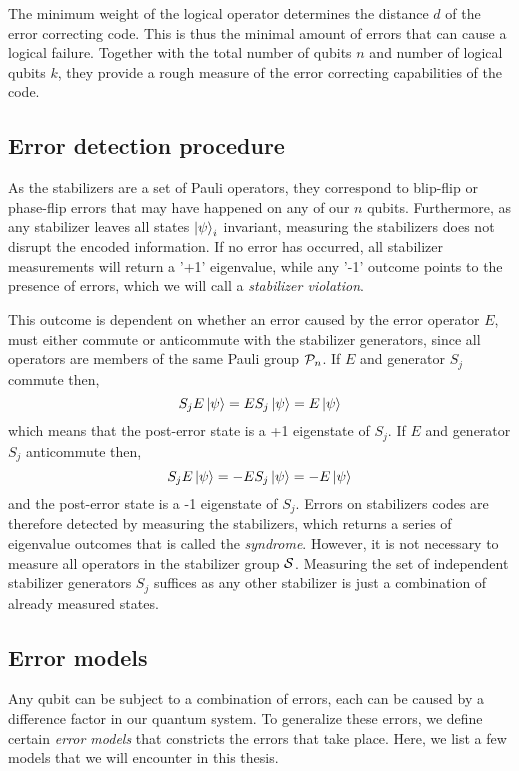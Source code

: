 The minimum weight of the logical operator determines the distance $d$ of the error correcting code. This is thus the minimal amount of errors that can cause a logical failure. Together with the total number of qubits $n$ and number of logical qubits $k$, they provide a rough measure of the error correcting capabilities of the code.

\subsection{Error detection procedure}

As the stabilizers are a set of Pauli operators, they correspond to blip-flip or phase-flip errors that may have happened on any of our $n$ qubits. Furthermore, as any stabilizer leaves all states  $\ket{\psi}_i$ invariant, measuring the stabilizers does not disrupt the encoded information. If no error has occurred, all stabilizer measurements will return a '+1' eigenvalue, while any '-1' outcome points to the presence of errors, which we will call a \emph{stabilizer violation}.

This outcome is dependent on whether an error caused by the error operator $E$, must either commute or anticommute with the stabilizer generators, since all operators are members of the same Pauli group $\mathcal{P}_n$. If $E$ and generator $S_j$ commute then,
\begin{equation}
  S_jE\ket{\psi} = ES_j\ket{\psi} = E\ket{\psi}
\end{equation}
which means that the post-error state is a +1 eigenstate of $S_j$. If $E$ and generator $S_j$ anticommute then,
\begin{equation}\label{qec:eq:stabmeas}
  S_jE\ket{\psi} = -ES_j\ket{\psi} = -E\ket{\psi}
\end{equation}
and the post-error state is a -1 eigenstate of $S_j$. Errors on stabilizers codes are therefore detected by measuring the stabilizers, which returns a series of eigenvalue outcomes that is called the \emph{syndrome}. However, it is not necessary to measure all operators in the stabilizer group $\mathcal{S}$. Measuring the set of independent stabilizer generators $S_j$ suffices as any other stabilizer is just a combination of already measured states.

\subsection{Error models}\label{qec:sec_errormodels}

Any qubit can be subject to a combination of errors, each can be caused by a difference factor in our quantum system. To generalize these errors, we define certain \emph{error models} that constricts the errors that take place. Here, we list a few models that we will encounter in this thesis. 

